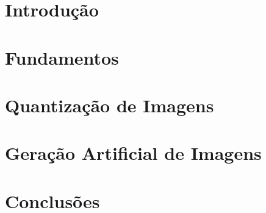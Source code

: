 \documentclass[mestrado, pre-defesa, english, brazil]{packages/icmc}
\begin{document}
\textual

\setcounter{page}{1}

\chapter{Introdução}
\label{cap:introducao}


\chapter{Fundamentos}
\label{cap:revisao}


\chapter{Quantização de Imagens}
\label{cap:quantization}


\chapter{Geração Artificial de Imagens}
\label{cap:geracao-artificial}


\chapter{Conclusões}
\label{cap:conclusoes}


%

\postextual



%
% 
\end{document}
